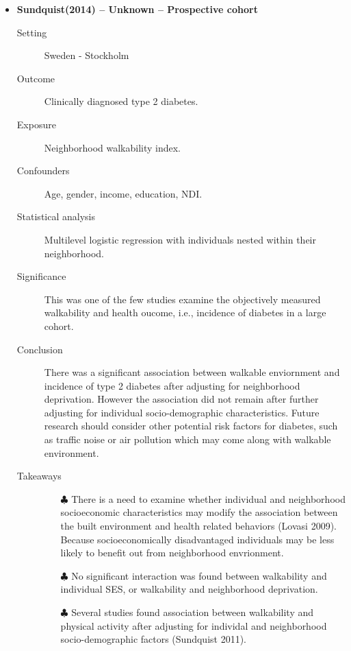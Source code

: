 \documentclass{article}
\begin{document}
\begin{itemize}
\item{\bf Sundquist(2014) -- Unknown  -- Prospective cohort} 
		\begin{description}
			\item[Setting] Sweden - Stockholm 
			\item[Outcome] Clinically diagnosed type 2 diabetes.
			\item[Exposure] Neighborhood walkability index.  
			\item[Confounders] Age, gender, income, education, NDI. 
			\item[Statistical analysis] Multilevel logistic regression with individuals nested within their neighborhood. 
			\item[Significance] This was one of the few studies examine the objectively measured walkability and health oucome, i.e., incidence of diabetes in a large cohort. 
			\item[Conclusion] There was a significant association between walkable enviornment and incidence of type 2 diabetes after adjusting for neighborhood deprivation. However the association did not remain after further adjusting for individual socio-demographic characteristics. Future research should consider other potential risk factors for diabetes, such as traffic noise or air pollution which may come along with walkable environment. 
			\item[Takeaways] \mbox{}\par
				\begin{itemize}
					\item[$\clubsuit$] There is a need to examine whether individual and neighborhood socioeconomic characteristics may modify the association between the built environment and health related behaviors (Lovasi 2009). Because socioeconomically disadvantaged individuals may be less likely to benefit out from neighborhood envrionment. 
					\item[$\clubsuit$] No significant interaction was found between walkability and individual SES, or walkability and neighborhood deprivation.
					\item[$\clubsuit$] Several studies found association between walkability and physical activity after adjusting for individal and neighborhood socio-demographic factors (Sundquist 2011). 
				\end{itemize} 
		\end{description}


\end{itemize}
\end{document}
